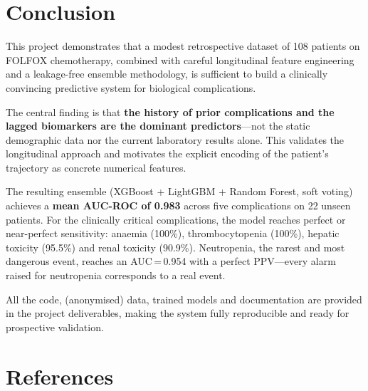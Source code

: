 \documentclass[12pt,a4paper]{report}
\begin{document}
\chapter{Conclusion}
\label{chap:conclusion}

This project demonstrates that a modest retrospective dataset of 108 patients on FOLFOX chemotherapy, combined with careful longitudinal feature engineering and a leakage-free ensemble methodology, is sufficient to build a clinically convincing predictive system for biological complications.

The central finding is that \textbf{the history of prior complications and the lagged biomarkers are the dominant predictors}---not the static demographic data nor the current laboratory results alone. This validates the longitudinal approach and motivates the explicit encoding of the patient's trajectory as concrete numerical features.

The resulting ensemble (XGBoost + LightGBM + Random Forest, soft voting) achieves a \textbf{mean AUC-ROC of 0.983} across five complications on 22 unseen patients. For the clinically critical complications, the model reaches perfect or near-perfect sensitivity: anaemia (100\%), thrombocytopenia (100\%), hepatic toxicity (95.5\%) and renal toxicity (90.9\%). Neutropenia, the rarest and most dangerous event, reaches an AUC\,=\,0.954 with a perfect PPV---every alarm raised for neutropenia corresponds to a real event.

All the code, (anonymised) data, trained models and documentation are provided in the project deliverables, making the system fully reproducible and ready for prospective validation.

\chapter*{References}
\end{document}
